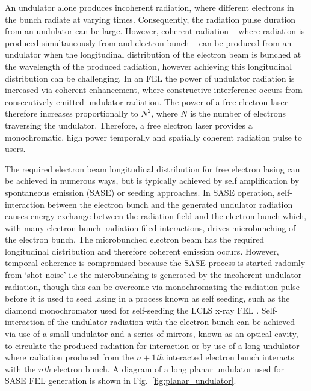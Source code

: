 \documentclass[../main.tex]{subfiles}
\begin{document}
An undulator alone produces incoherent radiation, where different electrons in the bunch radiate at varying times. Consequently, the radiation pulse duration from an undulator can be large. However, coherent radiation -- where radiation is produced simultaneously from and electron bunch -- can be produced from an undulator when the longitudinal distribution of the electron beam is bunched at the wavelength of the produced radiation, however achieving this longitudinal distribution can be challenging. In an FEL the power of undulator radiation is increased via coherent enhancement, where constructive interference occurs from consecutively emitted undulator radiation. The power of a free electron laser therefore increases proportionally to $N^{2}$, where $N$ is the number of electrons traversing the undulator. Therefore, a free electron laser provides a monochromatic, high power temporally and spatially coherent radiation pulse to users.  

The required electron beam longitudinal distribution for free electron lasing can be achieved in numerous ways, but is typically achieved by self amplification by spontaneous emission (SASE) or seeding approaches. In SASE operation, self-interaction between the electron bunch and the generated undulator radiation causes energy exchange between the radiation field and the electron bunch which, with many electron bunch--radiation filed interactions, drives microbunching of the electron bunch. The microbunched electron beam has the required longitudinal distribution and therefore coherent emission occurs. However, temporal coherence is compromised because the SASE process is started radomly from `shot noise' i.e the microbunching is generated by the incoherent undulator radiation, though this can be overcome via monochromating the radiation pulse before it is used to seed lasing in a process known as self seeding, such as the diamond monochromator used for self-seeding the LCLS x-ray FEL \cite{emma2010first
}. Self-interaction of the undulator radiation with the electron bunch can be achieved via use of a small undulator and a series of mirrors, known as an optical cavity, to circulate the produced radiation for interaction or by use of a long undulator where radiation produced from the $n+1$\textit{th} interacted electron bunch interacts with the $n$\textit{th} electron bunch. A diagram of a long planar undulator used for SASE FEL generation is shown in Fig.~\ref{fig:planar_undulator}. %
\end{document}
